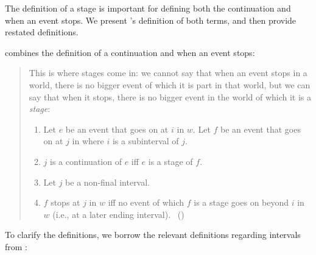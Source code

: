 \begin{note}
  The definition of a stage is important for defining both the continuation and when an event stops.
  We present \citeauthor{Landman:1992wh}'s definition of both terms, and then provide restated definitions.
\end{note}

\begin{note}
  \citeauthor{Landman:1992wh} combines the definition of a continuation and when an event stops:
  \begin{quote}
    This is where stages come in: we cannot say that when an event stops in a world, there is no bigger event of which it is part in that world, but we can say that when it stops, there is no bigger event in the world of which it is a \emph{stage}:
    \begin{enumerate}[label=, noitemsep]
    \item
      Let \(e\) be an event that goes on at \(i\) in \(w\).
      Let \(f\) be an event that goes on at \(j\) in where \(i\) is a subinterval of \(j\).
    \item
      \(j\) is a continuation of \(e\) iff \(e\) is a stage of \(f\).
    \item
      Let \(j\) be a non-final interval.
    \item
      \(f\) stops at \(j\) in \(w\) iff no event of which \(f\) is a stage goes on beyond \(i\) in \(w\) (i.e., at a later ending interval).\newline
      \mbox{ }\hfill\mbox{(\citeyear[23--24]{Landman:1992wh})}
    \end{enumerate}
  \end{quote}

  To clarify the definitions, we borrow the relevant definitions regarding intervals from \textcite{Dowty:1979vq}:


\end{note}

